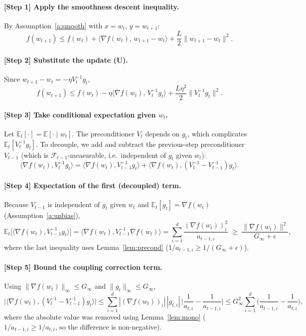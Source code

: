 \documentclass[11pt]{article}
\begin{document}
\paragraph{[Step 1] Apply the smoothness descent inequality.}
By Assumption~\ref{a:smooth} with $x=w_t$, $y=w_{t+1}$:
\[
f(w_{t+1}) \le f(w_t) + \langle \nabla f(w_t),\, w_{t+1}-w_t\rangle
            + \frac{L}{2}\|w_{t+1}-w_t\|^2 .
\]

\paragraph{[Step 2] Substitute the update (U).}
Since $w_{t+1}-w_t = -\eta V_t^{-1} g_t$,
\[
f(w_{t+1}) \le f(w_t) - \eta\langle \nabla f(w_t),\, V_t^{-1} g_t\rangle
            + \frac{L\eta^2}{2}\|V_t^{-1} g_t\|^2 .
\]

\paragraph{[Step 3] Take conditional expectation given $w_t$.}
Let $\mathbb{E}_t[\cdot]=\mathbb{E}[\cdot\mid w_t]$. The preconditioner $V_t$
depends on $g_t$, which complicates $\mathbb{E}_t[V_t^{-1}g_t]$. To decouple, we
add and subtract the previous-step preconditioner $V_{t-1}$ (which is
$\mathcal{F}_{t-1}$-measurable, i.e.\ independent of $g_t$ given $w_t$):
\[
\langle \nabla f(w_t), V_t^{-1} g_t\rangle
= \langle \nabla f(w_t), V_{t-1}^{-1} g_t\rangle
+ \langle \nabla f(w_t), (V_t^{-1}-V_{t-1}^{-1}) g_t\rangle .
\]

\paragraph{[Step 4] Expectation of the first (decoupled) term.}
Because $V_{t-1}$ is independent of $g_t$ given $w_t$ and
$\mathbb{E}_t[g_t]=\nabla f(w_t)$ (Assumption~\ref{a:unbias}),
\[
\mathbb{E}_t\big[\langle \nabla f(w_t), V_{t-1}^{-1} g_t\rangle\big]
= \langle \nabla f(w_t), V_{t-1}^{-1}\nabla f(w_t)\rangle
= \sum_{i=1}^d \frac{(\nabla f(w_t))_i^2}{a_{t-1,i}}
\;\ge\; \frac{\|\nabla f(w_t)\|^2}{G_\infty+\epsilon},
\]
where the last inequality uses Lemma~\ref{lem:precond}
($1/a_{t-1,i}\ge 1/(G_\infty+\epsilon)$).

\paragraph{[Step 5] Bound the coupling correction term.}
Using $\|\nabla f(w_t)\|_\infty\le G_\infty$ and $\|g_t\|_\infty\le G_\infty$,
\[
\big|\langle \nabla f(w_t), (V_t^{-1}-V_{t-1}^{-1}) g_t\rangle\big|
\le \sum_{i=1}^d |(\nabla f(w_t))_i|\,|g_{t,i}|\,
   \Big|\frac{1}{a_{t,i}}-\frac{1}{a_{t-1,i}}\Big|
\le G_\infty^2 \sum_{i=1}^d
   \Big(\frac{1}{a_{t-1,i}}-\frac{1}{a_{t,i}}\Big),
\]
where the absolute value was removed using Lemma~\ref{lem:mono}
($1/a_{t-1,i}\ge 1/a_{t,i}$, so the difference is non-negative).
\end{document}
